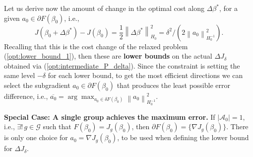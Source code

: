 \documentclass[11pt]{article}
\theoremstyle{plain}
\theoremstyle{definition}
\newcommand{\norm}[1]{\left\lVert #1 \right\rVert}
\newcommand{\1}{\mathbf{1}}
\newcommand{\G}{\mathcal{G}}
\newcommand{\A}{\mathcal{A}}
\begin{document}
Let us derive now the amount of change in the optimal cost along $\Delta \beta^*$, for a given $a_0 \in \partial F(\beta_0)$, i.e., 
\begin{equation}
\boxed{J(\beta_0 + \Delta \beta^*)-J(\beta_0)= \frac{1}{2}\norm{\Delta \beta^*}^2_{H_0} = {\delta^2}/ \left({2}\norm{a_0}^2_{H_0^{-1}}\right).     }
\end{equation}
Recalling that this is the cost change of the relaxed problem (\ref{opt:lower_bound_1}), then these are \textbf{lower bounds} on the actual $\Delta J_\delta$ obtained via (\ref{opt:intermediate_P_delta}). Since the constraint is setting the same level $-\delta$ for each lower bound, to get the most efficient directions we can select the subgradient $a_0\in \partial F(\beta_0)$ that produces the least possible error difference, i.e., $\overline{a_0}=\arg\max_{a_0 \in \delta F(\beta_0)} {\norm{a_0}^2_{H_0^{-1}}}$.


\begin{tcolorbox}[
    colback=lightgray, %
    width=\linewidth, %
    sharp corners=all %
]
\textbf{Special Case: A single group achieves the maximum error.} If  $|\A_0|=1$, i.e., $\exists!\, g \in \G$ such that $F(\beta_0)=J_g(\beta_0)$, then $\partial F(\beta_0)=\{\nabla J_g(\beta_0)\}$. There is only one choice for $a_0=\nabla J_g(\beta_0)$, to be used when defining the lower bound for $\Delta J_\delta$.
\end{tcolorbox}


\medskip
\end{document}
